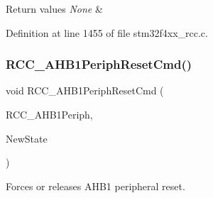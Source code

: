 \begin{DoxyRetVals}{Return values}
{\em None} & \\
\hline
\end{DoxyRetVals}


Definition at line 1455 of file stm32f4xx\+\_\+rcc.\+c.

\mbox{\label{group___r_c_c_gaa7c450567f4731d4f0615f63586cad86}} 
\subsubsection{\texorpdfstring{R\+C\+C\+\_\+\+A\+H\+B1\+Periph\+Reset\+Cmd()}{RCC\_AHB1PeriphResetCmd()}}
{\footnotesize\ttfamily void R\+C\+C\+\_\+\+A\+H\+B1\+Periph\+Reset\+Cmd (\begin{DoxyParamCaption}\item[{uint32\+\_\+t}]{R\+C\+C\+\_\+\+A\+H\+B1\+Periph,  }\item[{Functional\+State}]{New\+State }\end{DoxyParamCaption})}



Forces or releases A\+H\+B1 peripheral reset. 


